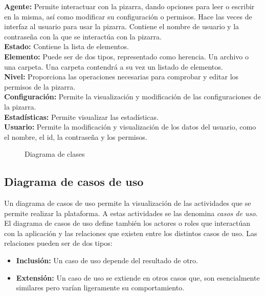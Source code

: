 \textbf{Agente:} Permite interactuar con la pizarra, dando opciones para leer o escribir en la misma, así como modificar su configuración o permisos. Hace las veces de interfaz al usuario para usar la pizarra. Contiene el nombre de usuario y la contraseña con la que se interactúa con la pizarra.\\

\textbf{Estado:} Contiene la lista de elementos.\\

\textbf{Elemento:} Puede ser de dos tipos, representado como herencia. Un archivo o una carpeta. Una carpeta contendrá a su vez un listado de elementos.\\

\textbf{Nivel: }Proporciona las operaciones necesarias para comprobar y editar los permisos de la pizarra.\\

\textbf{Configuración: }Permite la visualización y modificación de las configuraciones de la pizarra.\\

\textbf{Estadísticas: }Permite visualizar las estadísticas.\\

\textbf{Usuario:} Permite la modificación y visualización de los datos del usuario, como el nombre, el id, la contraseña y los permisos.


\begin{sidewaysfigure}
\centering
\clases
\caption{Diagrama de clases}
\end{sidewaysfigure}

\subsection{Diagrama de casos de uso}
Un diagrama de casos de uso permite la visualización de las actividades que se permite realizar la plataforma. A estas actividades se las denomina \textit{casos de uso}. El diagrama de casos de uso define también los actores o roles que interactúan con la aplicación y las relaciones que existen entre los distintos casos de uso. Las relaciones pueden ser de dos tipos:

\begin{itemize}
	\item \textbf{Inclusión:} Un caso de uso depende del resultado de otro.
	\item \textbf{Extensión:} Un caso de uso se extiende en otros casos que, son esencialmente similares pero varían ligeramente su comportamiento.
\end{itemize}

